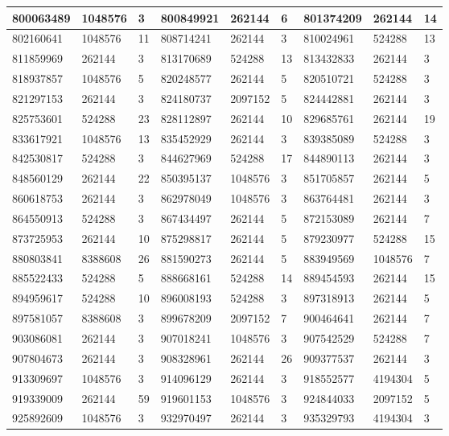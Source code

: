 \documentclass{article}
\begin{document}
\begin{longtable}{|l|l|l||l|l|l||l|l|l|}
\hline
800063489 & 1048576 & 3 & 800849921 & 262144 & 6 & 801374209 & 262144 & 14 \\
\hline
802160641 & 1048576 & 11 & 808714241 & 262144 & 3 & 810024961 & 524288 & 13 \\
\hline
811859969 & 262144 & 3 & 813170689 & 524288 & 13 & 813432833 & 262144 & 3 \\
\hline
818937857 & 1048576 & 5 & 820248577 & 262144 & 5 & 820510721 & 524288 & 3 \\
\hline
821297153 & 262144 & 3 & 824180737 & 2097152 & 5 & 824442881 & 262144 & 3 \\
\hline
825753601 & 524288 & 23 & 828112897 & 262144 & 10 & 829685761 & 262144 & 19 \\
\hline
833617921 & 1048576 & 13 & 835452929 & 262144 & 3 & 839385089 & 524288 & 3 \\
\hline
842530817 & 524288 & 3 & 844627969 & 524288 & 17 & 844890113 & 262144 & 3 \\
\hline
848560129 & 262144 & 22 & 850395137 & 1048576 & 3 & 851705857 & 262144 & 5 \\
\hline
860618753 & 262144 & 3 & 862978049 & 1048576 & 3 & 863764481 & 262144 & 3 \\
\hline
864550913 & 524288 & 3 & 867434497 & 262144 & 5 & 872153089 & 262144 & 7 \\
\hline
873725953 & 262144 & 10 & 875298817 & 262144 & 5 & 879230977 & 524288 & 15 \\
\hline
880803841 & 8388608 & 26 & 881590273 & 262144 & 5 & 883949569 & 1048576 & 7 \\
\hline
885522433 & 524288 & 5 & 888668161 & 524288 & 14 & 889454593 & 262144 & 15 \\
\hline
894959617 & 524288 & 10 & 896008193 & 524288 & 3 & 897318913 & 262144 & 5 \\
\hline
897581057 & 8388608 & 3 & 899678209 & 2097152 & 7 & 900464641 & 262144 & 7 \\
\hline
903086081 & 262144 & 3 & 907018241 & 1048576 & 3 & 907542529 & 524288 & 7 \\
\hline
907804673 & 262144 & 3 & 908328961 & 262144 & 26 & 909377537 & 262144 & 3 \\
\hline
913309697 & 1048576 & 3 & 914096129 & 262144 & 3 & 918552577 & 4194304 & 5 \\
\hline
919339009 & 262144 & 59 & 919601153 & 1048576 & 3 & 924844033 & 2097152 & 5 \\
\hline
925892609 & 1048576 & 3 & 932970497 & 262144 & 3 & 935329793 & 4194304 & 3 \\

\end{longtable}
\end{document}
